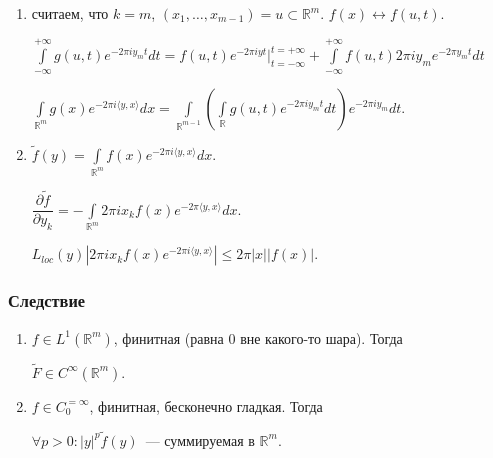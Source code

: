 \documentclass{article}
\begin{document}
            \begin{enumerate}
            
                \item считаем, что $k = m$, $(x_1, \ldots, x_{m - 1}) = u \subset \mathbb{R}^m$. $f(x) \leftrightarrow f(u, t)$.
                
                    $\int\limits^{+\infty}_{-\infty} g(u, t) e^{-2 \pi i y_m t} dt = f(u, t) e^{-2 \pi i y t} \bigg|^{t = +\infty}_{t = -\infty} + \int\limits^{+\infty}_{-\infty} f(u, t) 2 \pi i y_m e^{-2 \pi y_m t} dt$
                    
                    $\int\limits_{\mathbb{R}^m} g(x) e^{-2 \pi i \langle y, x \rangle} dx = \int\limits_{\mathbb{R}^{m - 1}} \left( \int\limits_{\mathbb{R}} g(u, t) e^{-2 \pi i y_m t} dt \right) e^{-2 \pi i y_m} dt$.
                    
                \item $\widetilde{f}(y) = \int\limits_{\mathbb{R}^m} f(x) e^{-2 \pi i \langle y, x \rangle} dx$.
                
                    $\dfrac{\partial \widetilde{f}}{\partial y_k} = - \int\limits_{\mathbb{R}^m} 2 \pi i x_k f(x) e^{-2 \pi \langle y, x \rangle} dx$.
                    
                        $L_{loc}(y) \left| 2 \pi i x_k f(x) e^{-2 \pi i \langle y, x \rangle} \right| \leqslant 2 \pi |x| | f(x) |$.
                
            \end{enumerate}
            
        \subsubsection{Следствие}
        
            \begin{enumerate}
            
                \item $f \in L^1 (\mathbb{R}^m)$, финитная (равна $0$ вне какого-то шара). Тогда
                
                    $\widetilde{F} \in C^{\infty} (\mathbb{R}^m)$.
                    
                \item $f \in C^{=\infty}_0$, финитная, бесконечно гладкая. Тогда
                
                    $\forall p > 0 : |y|^p \widetilde{f}(y)$~--- суммируемая в $\mathbb{R}^m$.
                
            \end{enumerate}
            
\end{document}
